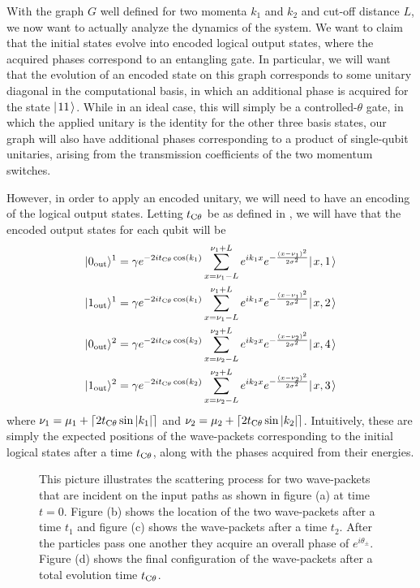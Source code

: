 \documentclass[../thesis-main/thesis-main]{subfiles}
\begin{document}
With the graph $G$ well defined for two momenta $k_1$ and $k_2$ and cut-off distance $L$, we now want to actually analyze the dynamics of the system.  We want to claim that the initial states evolve into encoded logical output states, where the acquired phases correspond to an entangling gate.  In particular, we will want that the evolution of an encoded state on this graph corresponds to some unitary diagonal in the computational basis, in which an additional phase is acquired for the state $|\mspace{2mu} 11 \mspace{2mu} \rangle$.  While in an ideal case, this will simply be a controlled-$\theta$ gate, in which the applied unitary is the identity for the other three basis states, our graph will also have additional phases corresponding to a product of single-qubit unitaries, arising from the transmission coefficients of the two momentum switches.

However, in order to apply an encoded unitary, we will need to have an encoding of the logical output states.  Letting $t_{\mathrm{C}\theta}$ be as defined in , we will have that the encoded output states for each qubit will be 
\begin{align}
  |0_\text{out}\rangle^1 &=\gamma e^{-2it_{\mathrm{C}\theta}\cos(k_1)}\sum_{x = \nu_1 -L} ^{\nu_1 + L}  e^{i k_{1} x} e^{- \frac{(x-\nu_1)^2}{2\sigma^2}} |\mspace{2mu} x,1 \mspace{2mu} \rangle
  \label{eq:cd_output_10}\\
  |1_\text{out}\rangle^1 &=\gamma e^{-2it_{\mathrm{C}\theta}\cos(k_1)} \sum_{x = \nu_1 -L} ^{\nu_1 + L}  e^{i k_{1} x} e^{- \frac{(x-\nu_1)^2}{2\sigma^2}} |\mspace{2mu} x,2 \mspace{2mu} \rangle \label{eq:cd_output_11}\\
  |0_\text{out}\rangle^2 &=\gamma e^{-2it_{\mathrm{C}\theta}\cos(k_2)} \sum_{x = \nu_2 -L} ^{\nu_2 + L}  e^{i k_{2} x} e^{- \frac{(x-\nu_2)^2}{2\sigma^2}} |\mspace{2mu} x,4 \mspace{2mu} \rangle \label{eq:cd_output_20}\\
  |1_\text{out}\rangle^2 &=\gamma e^{-2it_{\mathrm{C}\theta}\cos(k_2)} \sum_{x = \nu_2 -L} ^{\nu_2 + L}  e^{i k_{2} x} e^{- \frac{(x-\nu_2)^2}{2\sigma^2}} |\mspace{2mu} x,3 \mspace{2mu} \rangle\label{eq:cd_output_21}
\end{align}
where  $\nu_1=\mu_1 + \lceil 2t_{\mathrm{C}\theta} \sin |k_1|\rceil $ and $\nu_{2}=\mu_2 + \lceil 2 t_{\mathrm{C}\theta}\sin |k_2| \rceil$. Intuitively, these are simply the expected positions of the wave-packets corresponding to the initial logical states after a time $t_{\mathrm{C}\theta}$, along with the phases acquired from their energies.  

\begin{figure}
  \centering
   
  \caption[$\CD$ gate cartoon]{This picture illustrates the scattering process for two wave-packets that are incident on the input paths as shown in figure (a) at time $t=0$. Figure (b) shows the location of the two wave-packets after a time $t_{1}$ and figure (c) shows the wave-packets after a time $t_{2}$. After the particles pass one another they acquire an overall phase of $e^{i\theta_\pm}$. Figure (d) shows the final configuration of the wave-packets after a total evolution time $t_{\mathrm{C}\theta}$.}
  \label{fig:11_scattering_cartoon}
\end{figure}
\end{document}
